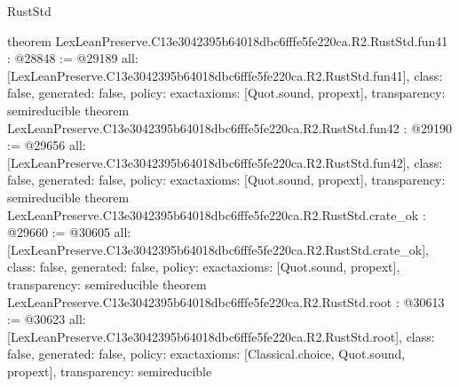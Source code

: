 \begin{lexlean}{RustStd}
\begin{coremodule}
{}
theorem LexLeanPreserve.C13e3042395b64018dbc6fffe5fe220ca.R2.RustStd.fun41 : @28848 := @29189 {
  all: [LexLeanPreserve.C13e3042395b64018dbc6fffe5fe220ca.R2.RustStd.fun41],
  class: false,
  generated: false,
  policy: exact{axioms: [Quot.sound, propext]},
  transparency: semireducible
}
theorem LexLeanPreserve.C13e3042395b64018dbc6fffe5fe220ca.R2.RustStd.fun42 : @29190 := @29656 {
  all: [LexLeanPreserve.C13e3042395b64018dbc6fffe5fe220ca.R2.RustStd.fun42],
  class: false,
  generated: false,
  policy: exact{axioms: [Quot.sound, propext]},
  transparency: semireducible
}
theorem LexLeanPreserve.C13e3042395b64018dbc6fffe5fe220ca.R2.RustStd.crate_ok : @29660 := @30605 {
  all: [LexLeanPreserve.C13e3042395b64018dbc6fffe5fe220ca.R2.RustStd.crate_ok],
  class: false,
  generated: false,
  policy: exact{axioms: [Quot.sound, propext]},
  transparency: semireducible
}
theorem LexLeanPreserve.C13e3042395b64018dbc6fffe5fe220ca.R2.RustStd.root : @30613 := @30623 {
  all: [LexLeanPreserve.C13e3042395b64018dbc6fffe5fe220ca.R2.RustStd.root],
  class: false,
  generated: false,
  policy: exact{axioms: [Classical.choice, Quot.sound, propext]},
  transparency: semireducible
}


\end{coremodule}
\end{lexlean}
